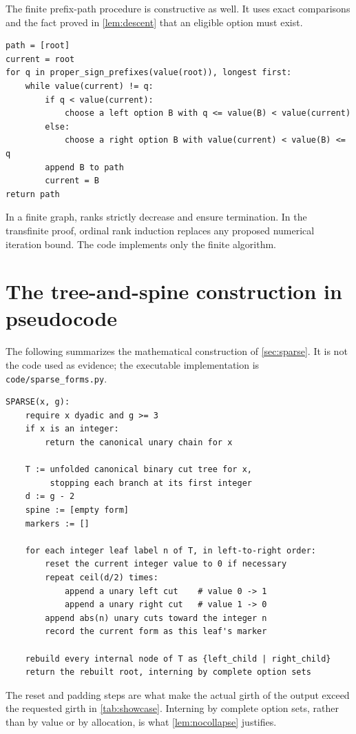 \documentclass[11pt,a4paper]{article}
\numberwithin{equation}{section}
\theoremstyle{definition}
\theoremstyle{remark}
\newcommand{\code}[1]{\texttt{#1}}
\begin{document}
The finite prefix-path procedure is constructive as well. It uses exact
comparisons and the fact proved in \cref{lem:descent} that an eligible option
must exist.

\begin{lstlisting}
path = [root]
current = root
for q in proper_sign_prefixes(value(root)), longest first:
    while value(current) != q:
        if q < value(current):
            choose a left option B with q <= value(B) < value(current)
        else:
            choose a right option B with value(current) < value(B) <= q
        append B to path
        current = B
return path
\end{lstlisting}

In a finite graph, ranks strictly decrease and ensure termination. In the
transfinite proof, ordinal rank induction replaces any proposed numerical
iteration bound. The code implements only the finite algorithm.

\section{The tree-and-spine construction in pseudocode}
\label{app:sparse-pseudocode}

The following summarizes the mathematical construction of \cref{sec:sparse}. It
is not the code used as evidence; the executable implementation is
\code{code/sparse\_forms.py}.

\begin{lstlisting}
SPARSE(x, g):
    require x dyadic and g >= 3
    if x is an integer:
        return the canonical unary chain for x

    T := unfolded canonical binary cut tree for x,
         stopping each branch at its first integer
    d := g - 2
    spine := [empty form]
    markers := []

    for each integer leaf label n of T, in left-to-right order:
        reset the current integer value to 0 if necessary
        repeat ceil(d/2) times:
            append a unary left cut    # value 0 -> 1
            append a unary right cut   # value 1 -> 0
        append abs(n) unary cuts toward the integer n
        record the current form as this leaf's marker

    rebuild every internal node of T as {left_child | right_child}
    return the rebuilt root, interning by complete option sets
\end{lstlisting}

The reset and padding steps are what make the actual girth of the output exceed
the requested girth in \cref{tab:showcase}. Interning by complete option sets,
rather than by value or by allocation, is what \cref{lem:nocollapse} justifies.
\end{document}
